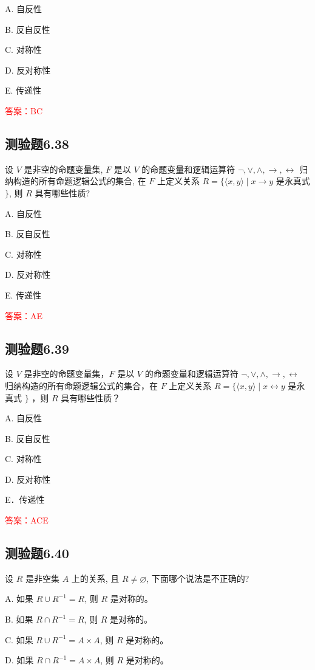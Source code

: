 \documentclass[UTF8, heading=true]{ctexart}
\begin{document}
A. 
自反性

B. 
反自反性

C. 
对称性

D. 
反对称性

E. 
传递性

\textcolor{red}{答案：BC}

\subsection{测验题6.38}

设 $V$ 是非空的命题变量集, $F$ 是以 $V$ 的命题变量和逻辑运算符 $\neg, \vee, \wedge, \rightarrow, \leftrightarrow$ 归纳构造的所有命题逻辑公式的集合, 在 $F$ 上定义关系 $R=\{\langle x, y\rangle \mid x \rightarrow y$ 是永真式 $\}$, 则 $R$ 具有哪些性质?

A. 自反性

B. 反自反性

C. 对称性

D. 反对称性

E. 传递性

\textcolor{red}{答案：AE}

\subsection{测验题6.39}


设 $V$ 是非空的命题变量集，$F$ 是以 $V$ 的命题变量和逻辑运算符 $\neg, \vee, \wedge, \rightarrow, \leftrightarrow$ 归纳构造的所有命题逻辑公式的集合，在 $F$ 上定义关系 $R=\{\langle x, y\rangle \mid x \leftrightarrow y$ 是永真式 $\}$ ，则 $R$ 具有哪些性质？

A. 自反性

B. 反自反性

C. 对称性

D. 反对称性

E．传递性

\textcolor{red}{答案：ACE}

\subsection{测验题6.40}
设 $R$ 是非空集 $A$ 上的关系, 且 $R \neq \varnothing$, 下面哪个说法是不正确的?

A. 如果 $R \cup R^{-1}=R$, 则 $R$ 是对称的。

B. 如果 $R \cap R^{-1}=R$, 则 $R$ 是对称的。

C. 如果 $R \cup R^{-1}=A \times A$, 则 $R$ 是对称的。

D. 如果 $R \cap R^{-1}=A \times A$, 则 $R$ 是对称的。
\end{document}
